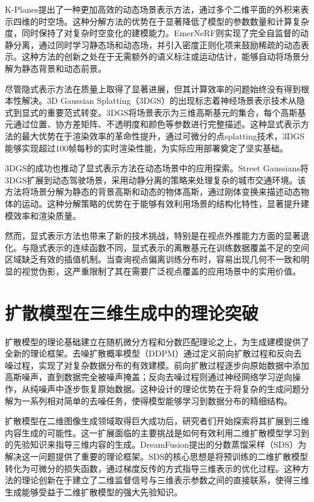 K-Planes提出了一种更加高效的动态场景表示方法，通过多个二维平面的外积来表示四维的时空场\cite{kplanes2023}。这种分解方法的优势在于显著降低了模型的参数数量和计算复杂度，同时保持了对复杂时空变化的建模能力。EmerNeRF则实现了完全自监督的动静分离，通过同时学习静态场和动态场，并引入密度正则化项来鼓励稀疏的动态表示\cite{emernerf2023}。这种方法的创新之处在于无需额外的语义标注或运动估计，能够自动将场景分解为静态背景和动态前景。

尽管隐式表示方法在质量上取得了显著进展，但其计算效率的问题始终没有得到根本性解决。3D Gaussian Splatting（3DGS）的出现标志着神经场景表示技术从隐式到显式的重要范式转变\cite{kerbl2023gaussian}。3DGS将场景表示为三维高斯基元的集合，每个高斯基元通过位置、协方差矩阵、不透明度和颜色等参数进行完整描述。这种显式表示方法的最大优势在于渲染效率的革命性提升，通过可微分的点splatting技术，3DGS能够实现超过100帧每秒的实时渲染性能，为实际应用部署奠定了坚实基础。

3DGS的成功也推动了显式表示方法在动态场景中的应用探索。Street Gaussians将3DGS扩展到动态驾驶场景，采用动静分离的策略来处理复杂的城市交通环境\cite{yan2024street}。该方法将场景分解为静态的背景高斯和动态的物体高斯，通过刚体变换来描述动态物体的运动。这种分解策略的优势在于能够有效利用场景的结构化特性，显著提升建模效率和渲染质量。

然而，显式表示方法也带来了新的技术挑战，特别是在视点外推能力方面的显著退化。与隐式表示的连续函数不同，显式表示的离散基元在训练数据覆盖不足的空间区域缺乏有效的插值机制。当查询视点偏离训练分布时，容易出现几何不一致和明显的视觉伪影，这严重限制了其在需要广泛视点覆盖的应用场景中的实用价值。

\section{扩散模型在三维生成中的理论突破}

扩散模型的理论基础建立在随机微分方程和分数匹配理论之上，为生成建模提供了全新的理论框架。去噪扩散概率模型（DDPM）通过定义前向扩散过程和反向去噪过程，实现了对复杂数据分布的有效建模\cite{ho2020denoising}。前向扩散过程逐步向原始数据中添加高斯噪声，直到数据完全被噪声掩盖；反向去噪过程则通过神经网络学习逆向操作，从纯噪声中逐步恢复原始数据。这种设计的理论优势在于将复杂的生成问题分解为一系列相对简单的去噪任务，使得模型能够学习到数据分布的精细结构。

扩散模型在二维图像生成领域取得巨大成功后，研究者们开始探索将其扩展到三维内容生成的可能性。这一扩展面临的主要挑战是如何有效利用二维扩散模型学习到的先验知识来指导三维内容的生成。DreamFusion提出的分数蒸馏采样（SDS）为解决这一问题提供了重要的理论框架\cite{dreamfusion2022}。SDS的核心思想是将预训练的二维扩散模型转化为可微分的损失函数，通过梯度反传的方式指导三维表示的优化过程。这种方法的理论创新在于建立了二维监督信号与三维表示参数之间的直接联系，使得三维生成能够受益于二维扩散模型的强大先验知识。

